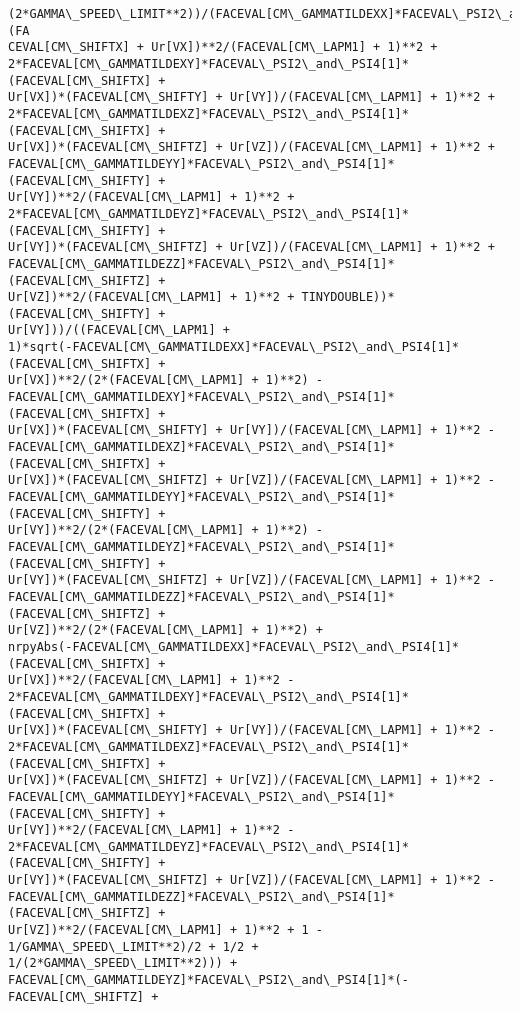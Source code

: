 \documentclass[landscape,letterpaper,10pt,english]{article}
\begin{document}
\begin{Verbatim}[commandchars=\\\{\}]
(2*GAMMA\_SPEED\_LIMIT**2))/(FACEVAL[CM\_GAMMATILDEXX]*FACEVAL\_PSI2\_and\_PSI4[1]*(FA
CEVAL[CM\_SHIFTX] + Ur[VX])**2/(FACEVAL[CM\_LAPM1] + 1)**2 +
2*FACEVAL[CM\_GAMMATILDEXY]*FACEVAL\_PSI2\_and\_PSI4[1]*(FACEVAL[CM\_SHIFTX] +
Ur[VX])*(FACEVAL[CM\_SHIFTY] + Ur[VY])/(FACEVAL[CM\_LAPM1] + 1)**2 +
2*FACEVAL[CM\_GAMMATILDEXZ]*FACEVAL\_PSI2\_and\_PSI4[1]*(FACEVAL[CM\_SHIFTX] +
Ur[VX])*(FACEVAL[CM\_SHIFTZ] + Ur[VZ])/(FACEVAL[CM\_LAPM1] + 1)**2 +
FACEVAL[CM\_GAMMATILDEYY]*FACEVAL\_PSI2\_and\_PSI4[1]*(FACEVAL[CM\_SHIFTY] +
Ur[VY])**2/(FACEVAL[CM\_LAPM1] + 1)**2 +
2*FACEVAL[CM\_GAMMATILDEYZ]*FACEVAL\_PSI2\_and\_PSI4[1]*(FACEVAL[CM\_SHIFTY] +
Ur[VY])*(FACEVAL[CM\_SHIFTZ] + Ur[VZ])/(FACEVAL[CM\_LAPM1] + 1)**2 +
FACEVAL[CM\_GAMMATILDEZZ]*FACEVAL\_PSI2\_and\_PSI4[1]*(FACEVAL[CM\_SHIFTZ] +
Ur[VZ])**2/(FACEVAL[CM\_LAPM1] + 1)**2 + TINYDOUBLE))*(FACEVAL[CM\_SHIFTY] +
Ur[VY]))/((FACEVAL[CM\_LAPM1] +
1)*sqrt(-FACEVAL[CM\_GAMMATILDEXX]*FACEVAL\_PSI2\_and\_PSI4[1]*(FACEVAL[CM\_SHIFTX] +
Ur[VX])**2/(2*(FACEVAL[CM\_LAPM1] + 1)**2) -
FACEVAL[CM\_GAMMATILDEXY]*FACEVAL\_PSI2\_and\_PSI4[1]*(FACEVAL[CM\_SHIFTX] +
Ur[VX])*(FACEVAL[CM\_SHIFTY] + Ur[VY])/(FACEVAL[CM\_LAPM1] + 1)**2 -
FACEVAL[CM\_GAMMATILDEXZ]*FACEVAL\_PSI2\_and\_PSI4[1]*(FACEVAL[CM\_SHIFTX] +
Ur[VX])*(FACEVAL[CM\_SHIFTZ] + Ur[VZ])/(FACEVAL[CM\_LAPM1] + 1)**2 -
FACEVAL[CM\_GAMMATILDEYY]*FACEVAL\_PSI2\_and\_PSI4[1]*(FACEVAL[CM\_SHIFTY] +
Ur[VY])**2/(2*(FACEVAL[CM\_LAPM1] + 1)**2) -
FACEVAL[CM\_GAMMATILDEYZ]*FACEVAL\_PSI2\_and\_PSI4[1]*(FACEVAL[CM\_SHIFTY] +
Ur[VY])*(FACEVAL[CM\_SHIFTZ] + Ur[VZ])/(FACEVAL[CM\_LAPM1] + 1)**2 -
FACEVAL[CM\_GAMMATILDEZZ]*FACEVAL\_PSI2\_and\_PSI4[1]*(FACEVAL[CM\_SHIFTZ] +
Ur[VZ])**2/(2*(FACEVAL[CM\_LAPM1] + 1)**2) +
nrpyAbs(-FACEVAL[CM\_GAMMATILDEXX]*FACEVAL\_PSI2\_and\_PSI4[1]*(FACEVAL[CM\_SHIFTX] +
Ur[VX])**2/(FACEVAL[CM\_LAPM1] + 1)**2 -
2*FACEVAL[CM\_GAMMATILDEXY]*FACEVAL\_PSI2\_and\_PSI4[1]*(FACEVAL[CM\_SHIFTX] +
Ur[VX])*(FACEVAL[CM\_SHIFTY] + Ur[VY])/(FACEVAL[CM\_LAPM1] + 1)**2 -
2*FACEVAL[CM\_GAMMATILDEXZ]*FACEVAL\_PSI2\_and\_PSI4[1]*(FACEVAL[CM\_SHIFTX] +
Ur[VX])*(FACEVAL[CM\_SHIFTZ] + Ur[VZ])/(FACEVAL[CM\_LAPM1] + 1)**2 -
FACEVAL[CM\_GAMMATILDEYY]*FACEVAL\_PSI2\_and\_PSI4[1]*(FACEVAL[CM\_SHIFTY] +
Ur[VY])**2/(FACEVAL[CM\_LAPM1] + 1)**2 -
2*FACEVAL[CM\_GAMMATILDEYZ]*FACEVAL\_PSI2\_and\_PSI4[1]*(FACEVAL[CM\_SHIFTY] +
Ur[VY])*(FACEVAL[CM\_SHIFTZ] + Ur[VZ])/(FACEVAL[CM\_LAPM1] + 1)**2 -
FACEVAL[CM\_GAMMATILDEZZ]*FACEVAL\_PSI2\_and\_PSI4[1]*(FACEVAL[CM\_SHIFTZ] +
Ur[VZ])**2/(FACEVAL[CM\_LAPM1] + 1)**2 + 1 - 1/GAMMA\_SPEED\_LIMIT**2)/2 + 1/2 +
1/(2*GAMMA\_SPEED\_LIMIT**2))) +
FACEVAL[CM\_GAMMATILDEYZ]*FACEVAL\_PSI2\_and\_PSI4[1]*(-FACEVAL[CM\_SHIFTZ] +

\end{Verbatim}
\end{document}
